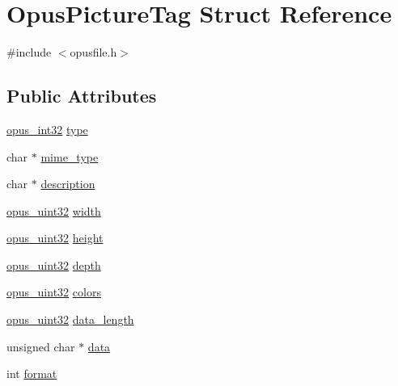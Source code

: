 \hypertarget{struct_opus_picture_tag}{}\section{Opus\+Picture\+Tag Struct Reference}
\label{struct_opus_picture_tag}


{\ttfamily \#include $<$opusfile.\+h$>$}

\subsection*{Public Attributes}
\begin{DoxyCompactItemize}
\item 
\mbox{\hyperlink{opus__types_8h_aa4d309d6f80b99dbabebc8f98879ab9a}{opus\+\_\+int32}} \mbox{\hyperlink{struct_opus_picture_tag_a6e668caeb395b1ec7d438d4a4a9fa845}{type}}
\item 
char $\ast$ \mbox{\hyperlink{struct_opus_picture_tag_ace7f4978d815b186f6aebefed938c9e2}{mime\+\_\+type}}
\item 
char $\ast$ \mbox{\hyperlink{struct_opus_picture_tag_aa32d8bfcd831aa218b0de6d6af92dc08}{description}}
\item 
\mbox{\hyperlink{opus__types_8h_a643eaaadb9ef6cd44308e0299d8cd8ce}{opus\+\_\+uint32}} \mbox{\hyperlink{struct_opus_picture_tag_a805d4de3372bac983cadbd916350ddd6}{width}}
\item 
\mbox{\hyperlink{opus__types_8h_a643eaaadb9ef6cd44308e0299d8cd8ce}{opus\+\_\+uint32}} \mbox{\hyperlink{struct_opus_picture_tag_a2de29a7eef41d13031c70786665eb638}{height}}
\item 
\mbox{\hyperlink{opus__types_8h_a643eaaadb9ef6cd44308e0299d8cd8ce}{opus\+\_\+uint32}} \mbox{\hyperlink{struct_opus_picture_tag_a9af23c314edf9a995c95a4d28f49eac0}{depth}}
\item 
\mbox{\hyperlink{opus__types_8h_a643eaaadb9ef6cd44308e0299d8cd8ce}{opus\+\_\+uint32}} \mbox{\hyperlink{struct_opus_picture_tag_a6fe2f98151fa32a8e2fd13f9309bd1a2}{colors}}
\item 
\mbox{\hyperlink{opus__types_8h_a643eaaadb9ef6cd44308e0299d8cd8ce}{opus\+\_\+uint32}} \mbox{\hyperlink{struct_opus_picture_tag_aaa458d48cd3c9c86b54614389f5b726d}{data\+\_\+length}}
\item 
unsigned char $\ast$ \mbox{\hyperlink{struct_opus_picture_tag_a0514cb1431547c8b3042b9f3bc9b694f}{data}}
\item 
int \mbox{\hyperlink{struct_opus_picture_tag_aba2d71a09ecf0999cf5faf7c2276fb37}{format}}
\end{DoxyCompactItemize}


